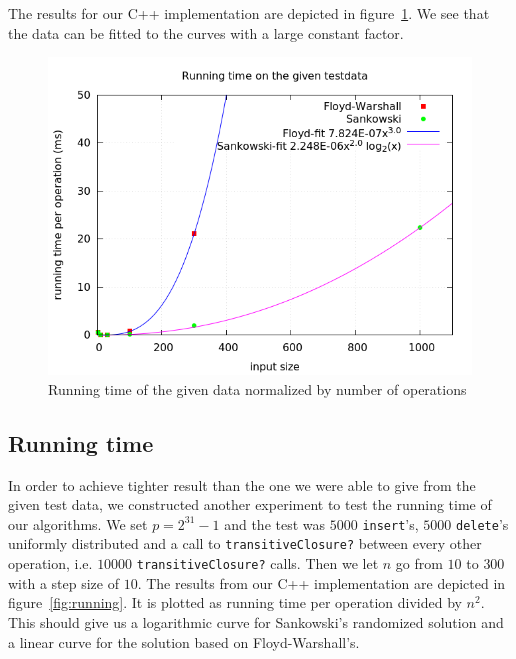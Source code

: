 \documentclass[a4paper,oneside,article,11pt]{memoir}
\begin{document}
The results for our C++ implementation are depicted in figure~\ref{fig:norm-run-comb}. We see that the data can be fitted to the curves with a large constant factor.
\begin{figure}[ht]
\includegraphics[width=\textwidth]{images/normalized-given-data-running.png}
\caption{Running time of the given data normalized by number of operations}
\label{fig:norm-run-comb}
\end{figure}

\subsection{Running time}
In order to achieve tighter result than the one we were able to give from the given test data, we constructed another experiment to test the running time of our algorithms. We set $p=2^{31}-1$ and the test was $5000$ \texttt{insert}'s, $5000$ \texttt{delete}'s uniformly distributed and a call to \texttt{transitiveClosure?} between every other operation, i.e. $10000$ \texttt{transitiveClosure?} calls. Then we let $n$ go from $10$ to $300$ with a step size of $10$. The results from our C++ implementation are depicted in figure~\ref{fig:running}. It is plotted as running time per operation divided by $n^2$. This should give us a logarithmic curve for Sankowski's randomized solution and a linear curve for the solution based on Floyd-Warshall's.
\end{document}
